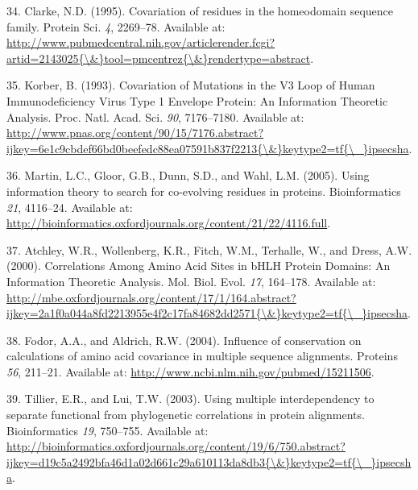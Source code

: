 \documentclass[12pt,a4paper,twoside]{book}
\theoremstyle{definition}
\theoremstyle{definition}
\theoremstyle{remark}
\begin{document}
\hypertarget{ref-Clarke1995}{}
34. Clarke, N.D. (1995). Covariation of residues in the homeodomain
sequence family. Protein Sci. \emph{4}, 2269--78. Available at:
\href{http://www.pubmedcentral.nih.gov/articlerender.fcgi?artid=2143025\%7B/\&\%7Dtool=pmcentrez\%7B/\&\%7Drendertype=abstract}{http://www.pubmedcentral.nih.gov/articlerender.fcgi?artid=2143025\{\textbackslash{}\&\}tool=pmcentrez\{\textbackslash{}\&\}rendertype=abstract}.

\hypertarget{ref-Korber1993}{}
35. Korber, B. (1993). Covariation of Mutations in the V3 Loop of Human
Immunodeficiency Virus Type 1 Envelope Protein: An Information Theoretic
Analysis. Proc. Natl. Acad. Sci. \emph{90}, 7176--7180. Available at:
\href{http://www.pnas.org/content/90/15/7176.abstract?ijkey=6e1c9cbdef66bd0beefedc88ea07591b837f2213\%7B/\&\%7Dkeytype2=tf\%7B/_\%7Dipsecsha}{http://www.pnas.org/content/90/15/7176.abstract?ijkey=6e1c9cbdef66bd0beefedc88ea07591b837f2213\{\textbackslash{}\&\}keytype2=tf\{\textbackslash{}\_\}ipsecsha}.

\hypertarget{ref-Martin2005}{}
36. Martin, L.C., Gloor, G.B., Dunn, S.D., and Wahl, L.M. (2005). Using
information theory to search for co-evolving residues in proteins.
Bioinformatics \emph{21}, 4116--24. Available at:
\url{http://bioinformatics.oxfordjournals.org/content/21/22/4116.full}.

\hypertarget{ref-Atchley2000}{}
37. Atchley, W.R., Wollenberg, K.R., Fitch, W.M., Terhalle, W., and
Dress, A.W. (2000). Correlations Among Amino Acid Sites in bHLH Protein
Domains: An Information Theoretic Analysis. Mol. Biol. Evol. \emph{17},
164--178. Available at:
\href{http://mbe.oxfordjournals.org/content/17/1/164.abstract?ijkey=2a1f0a044a8fd2213955e4f2c17fa84682dd2571\%7B/\&\%7Dkeytype2=tf\%7B/_\%7Dipsecsha}{http://mbe.oxfordjournals.org/content/17/1/164.abstract?ijkey=2a1f0a044a8fd2213955e4f2c17fa84682dd2571\{\textbackslash{}\&\}keytype2=tf\{\textbackslash{}\_\}ipsecsha}.

\hypertarget{ref-Fodor2004}{}
38. Fodor, A.A., and Aldrich, R.W. (2004). Influence of conservation on
calculations of amino acid covariance in multiple sequence alignments.
Proteins \emph{56}, 211--21. Available at:
\url{http://www.ncbi.nlm.nih.gov/pubmed/15211506}.

\hypertarget{ref-Tillier2003}{}
39. Tillier, E.R., and Lui, T.W. (2003). Using multiple interdependency
to separate functional from phylogenetic correlations in protein
alignments. Bioinformatics \emph{19}, 750--755. Available at:
\href{http://bioinformatics.oxfordjournals.org/content/19/6/750.abstract?ijkey=d19c5a2492bfa46d1a02d661c29a610113da8db3\%7B/\&\%7Dkeytype2=tf\%7B/_\%7Dipsecsha}{http://bioinformatics.oxfordjournals.org/content/19/6/750.abstract?ijkey=d19c5a2492bfa46d1a02d661c29a610113da8db3\{\textbackslash{}\&\}keytype2=tf\{\textbackslash{}\_\}ipsecsha}.
\end{document}
